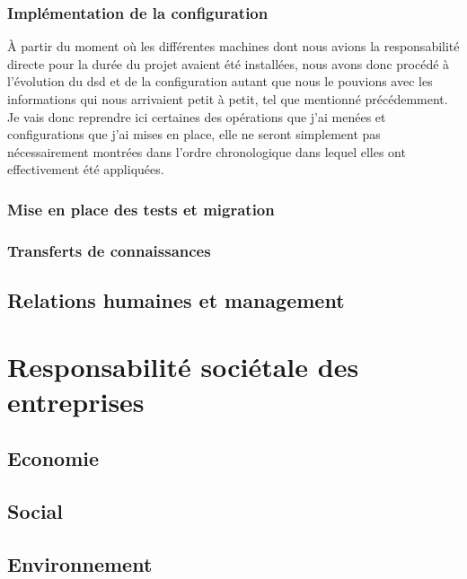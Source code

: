 \documentclass[12pt, oneside, a4paper, titlepage]{report}
\begin{document}
\subsection{Implémentation de la configuration}%
\label{sub:mission::main::implem}

À partir du moment où les différentes machines dont nous avions la
responsabilité directe pour la durée du projet avaient été installées, nous
avons donc procédé à l'évolution du \gls{dsd} et de la configuration autant que
nous le pouvions avec les informations qui nous arrivaient petit à petit, tel
que mentionné précédemment. Je vais donc reprendre ici certaines des opérations
que j'ai menées et configurations que j'ai mises en place, elle ne seront
simplement pas nécessairement montrées dans l'ordre chronologique dans lequel
elles ont effectivement été appliquées.

\subsection{Mise en place des tests et migration}%
\label{sub:mission::main::tests}

\subsection{Transferts de connaissances}%
\label{sub:mission::main::trans}


\section{Relations humaines et management}%
\label{sec:mission::rhm}


\chapter{Responsabilité sociétale des entreprises}%
\label{cha:rse}

\section{Economie}%
\label{sec:rse::eco}

\section{Social}%
\label{sec:rse::social}

\section{Environnement}%
\label{sec:rse::env}
\end{document}

